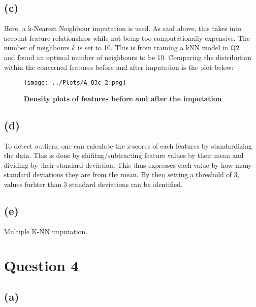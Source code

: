 \documentclass[12pt]{report} %
\begin{document}
\subsection*{(c)}

Here, a k-Nearest Neighbour imputation is used. As said above, this takes into account feature relationships while not being too computationally expensive. The number of neighbours $k$ is set to 10. This is from training a kNN model in Q2 and found an optimal number of neighbours to be 10. Comparing the distribution within the concerned features before and after imputation is the plot below:


\begin{figure}[htbp]
    \centering
    \texttt{[image: ../Plots/A\_Q3c\_2.png]}
    \caption{\textbf{Density plots of features before and after the imputation}}
\end{figure}

\subsection*{(d)}

To detect outliers, one can calculate the z-scores of each features by standardizing the data. This is done by shifitng/subtracting feature values by their mean and dividing by their standard deviation\cite[p. 73]{sklearn_book}. This thus expresses each value by how many standard deviations they are from the mean. By then setting a threshold of 3, values furhter than 3 standard deviations can be identified.

\subsection*{(e)}

Multiple K-NN imputation.



\section*{Question 4}

\subsection*{(a)}
\end{document}
